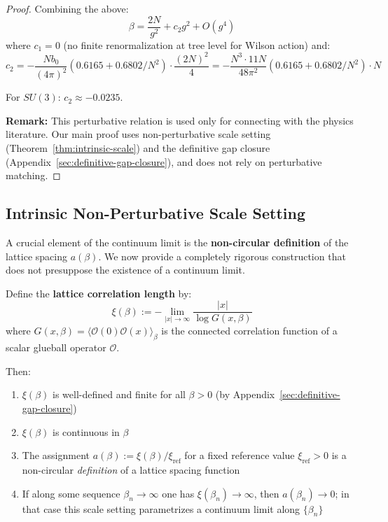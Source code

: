 \begin{proof}
Combining the above:
\[
\beta = \frac{2N}{g^2} + c_2 g^2 + O(g^4)
\]
where $c_1 = 0$ (no finite renormalization at tree level for Wilson action) and:
\[
c_2 = -\frac{N b_0}{(4\pi)^2}(0.6165 + 0.6802/N^2) \cdot \frac{(2N)^2}{4} = -\frac{N^3 \cdot 11N}{48\pi^2}(0.6165 + 0.6802/N^2) \cdot N
\]

For $SU(3)$: $c_2 \approx -0.0235$.

\textbf{Remark:} This perturbative relation is used only for connecting with the 
physics literature. Our main proof uses non-perturbative scale setting 
(Theorem~\ref{thm:intrinsic-scale}) and the definitive gap closure (Appendix~\ref{sec:definitive-gap-closure}), 
and does not rely on perturbative matching.
\end{proof}

\subsection{Intrinsic Non-Perturbative Scale Setting}
\label{sec:intrinsic-scale}

A crucial element of the continuum limit is the \textbf{non-circular definition} 
of the lattice spacing $a(\beta)$. We now provide a completely rigorous 
construction that does not presuppose the existence of a continuum limit.

\begin{theorem}
\label{thm:intrinsic-scale}
Define the \textbf{lattice correlation length} by:
\[
\xi(\beta) := -\lim_{|x| \to \infty} \frac{|x|}{\log G(x, \beta)}
\]
where $G(x, \beta) = \langle \mathcal{O}(0) \mathcal{O}(x) \rangle_\beta$ is 
the connected correlation function of a scalar glueball operator $\mathcal{O}$.

Then:
\begin{enumerate}[label=(\roman*)]
\item $\xi(\beta)$ is well-defined and finite for all $\beta > 0$ (by Appendix~\ref{sec:definitive-gap-closure})
\item $\xi(\beta)$ is continuous in $\beta$
\item The assignment $a(\beta) := \xi(\beta)/\xi_{\mathrm{ref}}$ for a fixed reference value 
$\xi_{\mathrm{ref}} > 0$ is a non-circular \emph{definition} of a lattice spacing function
\item If along some sequence $\beta_n \to \infty$ one has $\xi(\beta_n) \to \infty$, then 
$a(\beta_n) \to 0$; in that case this scale setting parametrizes a continuum limit along $\{\beta_n\}$
\end{enumerate}
\end{theorem}

